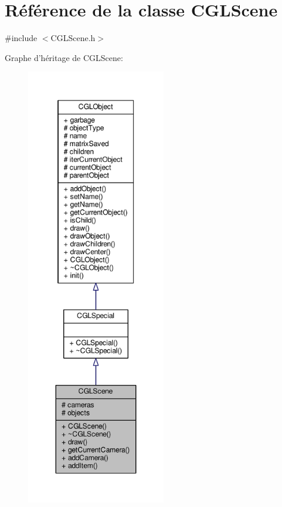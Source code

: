 \hypertarget{class_c_g_l_scene}{\section{Référence de la classe C\-G\-L\-Scene}
\label{class_c_g_l_scene}
}


{\ttfamily \#include $<$C\-G\-L\-Scene.\-h$>$}



Graphe d'héritage de C\-G\-L\-Scene\-:\nopagebreak
\begin{figure}[H]
\begin{center}
\leavevmode
\includegraphics[height=550pt]{dd/d28/class_c_g_l_scene__inherit__graph}
\end{center}
\end{figure}


